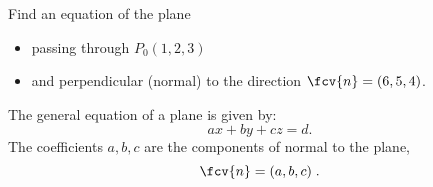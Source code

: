 \begin{frame}
\begin{example}
Find an equation of the plane
\begin{itemize}
\item passing through $P_0(1,2,3)$
\item and perpendicular (normal) to the direction $ \fcv{n} = ( 6,5,4)$.
\end{itemize}
%

\end{example}
\pause The general equation of a plane is given by:
%
$$ax+by+cz = d .$$
%
The coefficients $a,b,c$ are \pause the components of normal to the plane,
%
$$ \fcv{n} = ( a,b,c)\; .$$

\end{frame}
